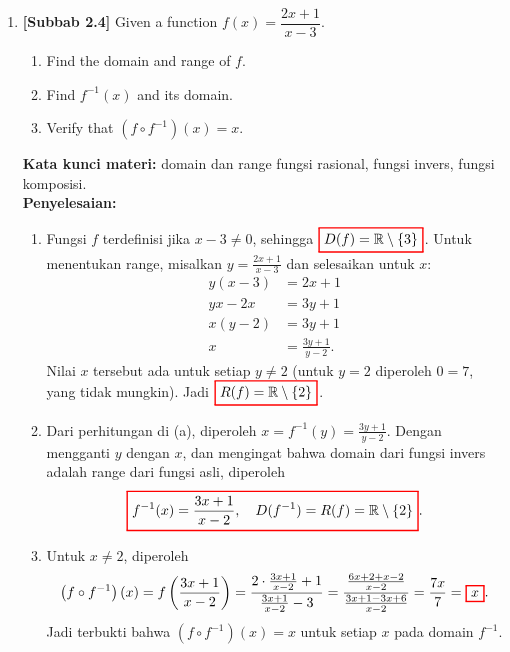 \documentclass[10pt,openany,a4paper]{article}
\theoremstyle{definition}
\theoremstyle{definition}
\theoremstyle{plain}
\newenvironment{jawab}[2][tes]{%
\par\noindent\textbf{Kata kunci materi:} #1.\\
\textbf{Penyelesaian:} #2%
}{}
\begin{document}
\begin{enumerate}
    \item \textbf{[Subbab 2.4]} Given a function $f(x)=\dfrac{2x+1}{x-3}$.
    \begin{enumerate}
        \item Find the domain and range of $f$.
        \item Find $f^{-1}(x)$ and its domain.
        \item Verify that $\left(f\circ f^{-1}\right)(x)=x$.
    \end{enumerate}
    \begin{jawab}[domain dan range fungsi rasional, fungsi invers, fungsi komposisi]{
        \begin{enumerate}
            \item Fungsi $f$ terdefinisi jika $x-3\neq 0$, sehingga $\colorlet{oldcolor}{.}
        \color{red}
        \setlength{\fboxrule}{1pt} \boxed{\color{oldcolor}D(f)=\mathbb{R}\setminus\{3\}}\color{oldcolor}$. Untuk menentukan range, misalkan $y=\frac{2x+1}{x-3}$ dan selesaikan untuk $x$:
            \begin{align*}
                y(x-3) &= 2x+1\\
                yx-2x &= 3y+1\\
                x(y-2) &= 3y+1\\
                x &= \frac{3y+1}{y-2}.
            \end{align*}
            Nilai $x$ tersebut ada untuk setiap $y\neq 2$ (untuk $y=2$ diperoleh $0=7$, yang tidak mungkin). Jadi $\colorlet{oldcolor}{.}
        \color{red}
        \setlength{\fboxrule}{1pt} \boxed{\color{oldcolor}R(f)=\mathbb{R}\setminus\{2\}}\color{oldcolor}$.
            \item Dari perhitungan di (a), diperoleh $x=f^{-1}(y)=\frac{3y+1}{y-2}$. Dengan mengganti $y$ dengan $x$, dan mengingat bahwa domain dari fungsi invers adalah range dari fungsi asli, diperoleh
            \begin{align*}
                \colorlet{oldcolor}{.}
        \color{red}
        \setlength{\fboxrule}{1pt} \boxed{\color{oldcolor}f^{-1}(x)=\frac{3x+1}{x-2},\quad D(f^{-1})=R(f)=\mathbb{R}\setminus\{2\}}\color{oldcolor}.
            \end{align*}
            \item Untuk $x\neq 2$, diperoleh
            \begin{align*}
                \left(f\circ f^{-1}\right)(x) = f\left(\frac{3x+1}{x-2}\right) = \frac{2\cdot\frac{3x+1}{x-2}+1}{\frac{3x+1}{x-2}-3} = \frac{\frac{6x+2+x-2}{x-2}}{\frac{3x+1-3x+6}{x-2}} = \frac{7x}{7} = \colorlet{oldcolor}{.}
        \color{red}
        \setlength{\fboxrule}{1pt} \boxed{\color{oldcolor}x}\color{oldcolor}.
            \end{align*}
            Jadi terbukti bahwa $\left(f\circ f^{-1}\right)(x)=x$ untuk setiap $x$ pada domain $f^{-1}$.
        \end{enumerate}
    }
    \end{jawab}

\end{enumerate}
\end{document}

